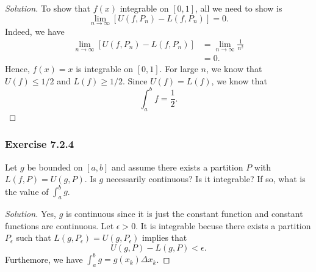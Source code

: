 \begin{enumerate}
		\begin{proof}[Solution]
			To show that \( f(x)  \) integrable on \( [0,1] \), all we need to show is 
			\[  \lim_{ n \to \infty  }  [ U(f, P_{n}) - L(f, P_{n })] = 0.  \]
			Indeed, we have 
			\begin{align*}
			    \lim_{ n \to \infty  }  [ U(f, P_{n}) - L(f, P_{n })] &= \lim_{ n \to \infty  } \frac{ 1 }{ n^2 }  \\
																	  &= 0. 
			\end{align*}
			Hence, \( f(x) = x  \) is integrable on \( [0,1] \). For large \( n  \), we know that 
			\( U(f) \leq 1 /2  \) and \( L(f) \geq 1 / 2  \). Since \( U(f) = L(f)  \), we know that 
			\[  \int_{ a }^{ b } f  = \frac{ 1 }{ 2 }. \]
		\end{proof}
\end{enumerate}


\subsubsection{Exercise 7.2.4} Let \( g  \) be bounded on \( [a,b]  \) and assume there exists a partition \( P  \) with \( L(f, P) = U(g,P)  \). Is \( g  \) necessarily continuous? Is it integrable? If so, what is the value of \( \int_{ a }^{ b }  g \).
\begin{proof}[Solution]
	Yes, \( g  \) is continuous since it is just the constant function and constant functions are continuous. Let \( \epsilon > 0  \). It is integrable becuse there exists a partition \( P_{\epsilon } \) such that \( L(g,P_{\epsilon }) = U(g,P_{\epsilon })  \) implies that 
	\[ U(g,P) - L(g,P) < \epsilon.  \] Furthemore, we have \( \int_{ a }^{ b }  g = g(x_{k }) \Delta x_{k } \).
\end{proof}





